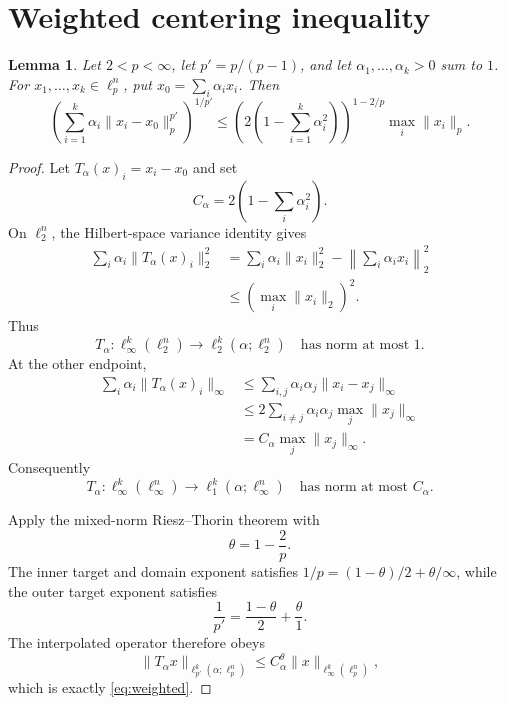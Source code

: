 \documentclass[11pt]{article}
\newtheorem{lemma}[theorem]{Lemma}
\begin{document}
\section{Weighted centering inequality}

\begin{lemma}\label{lem:weighted}
Let $2<p<\infty$, let $p'=p/(p-1)$, and let
$\alpha_1,\ldots,\alpha_k>0$ sum to $1$.  For
$x_1,\ldots,x_k\in\ell_p^n$, put $x_0=\sum_i\alpha_i x_i$.  Then
\begin{equation}\label{eq:weighted}
 \left(\sum_{i=1}^k\alpha_i\|x_i-x_0\|_p^{p'}\right)^{1/p'}
 \le
 \left(2\left(1-\sum_{i=1}^k\alpha_i^2\right)\right)^{1-2/p}
 \max_i\|x_i\|_p.
\end{equation}
\end{lemma}

\begin{proof}
Let $T_\alpha(x)_i=x_i-x_0$ and set
\[
 C_\alpha=2\left(1-\sum_i\alpha_i^2\right).
\]
On $\ell_2^n$, the Hilbert-space variance identity gives
\begin{align*}
 \sum_i\alpha_i\|T_\alpha(x)_i\|_2^2
 &=\sum_i\alpha_i\|x_i\|_2^2-\left\|\sum_i\alpha_i x_i\right\|_2^2\\
 &\le \left(\max_i\|x_i\|_2\right)^2.
\end{align*}
Thus
\[
 T_\alpha:\ell_\infty^k(\ell_2^n)
       \longrightarrow \ell_2^k(\alpha;\ell_2^n)
 \quad\text{has norm at most }1.
\]
At the other endpoint,
\begin{align*}
 \sum_i\alpha_i\|T_\alpha(x)_i\|_\infty
 &\le \sum_{i,j}\alpha_i\alpha_j\|x_i-x_j\|_\infty\\
 &\le 2\sum_{i\ne j}\alpha_i\alpha_j\max_j\|x_j\|_\infty\\
 &=C_\alpha\max_j\|x_j\|_\infty.
\end{align*}
Consequently
\[
 T_\alpha:\ell_\infty^k(\ell_\infty^n)
       \longrightarrow \ell_1^k(\alpha;\ell_\infty^n)
 \quad\text{has norm at most }C_\alpha.
\]

Apply the mixed-norm Riesz--Thorin theorem \cite[Section 14]{WilliamsWells}
with
\[
 \theta=1-\frac2p.
\]
The inner target and domain exponent satisfies
$1/p=(1-\theta)/2+\theta/\infty$, while the outer target exponent satisfies
\[
 \frac1{p'}=\frac{1-\theta}{2}+\frac{\theta}{1}.
\]
The interpolated operator therefore obeys
\[
 \|T_\alpha x\|_{\ell_{p'}^k(\alpha;\ell_p^n)}
 \le C_\alpha^\theta
 \|x\|_{\ell_\infty^k(\ell_p^n)},
\]
which is exactly \eqref{eq:weighted}.
\end{proof}
\end{document}
